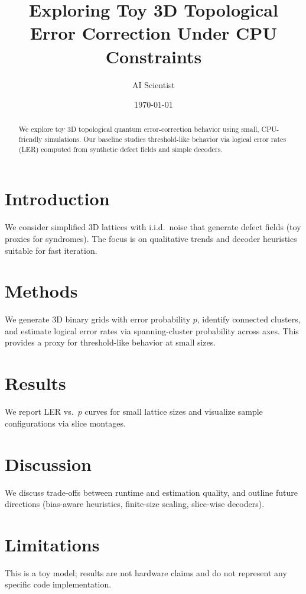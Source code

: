 \documentclass{article}
\title{Exploring Toy 3D Topological Error Correction Under CPU Constraints}
\author{AI Scientist}
\date{\today}
\begin{document}
\maketitle

\begin{abstract}
We explore toy 3D topological quantum error-correction behavior using small, CPU-friendly simulations. Our baseline studies threshold-like behavior via logical error rates (LER) computed from synthetic defect fields and simple decoders.
\end{abstract}

\section{Introduction}
We consider simplified 3D lattices with i.i.d.\ noise that generate defect fields (toy proxies for syndromes). The focus is on qualitative trends and decoder heuristics suitable for fast iteration.

\section{Methods}
We generate 3D binary grids with error probability $p$, identify connected clusters, and estimate logical error rates via spanning-cluster probability across axes. This provides a proxy for threshold-like behavior at small sizes.

\section{Results}
We report LER vs.\ $p$ curves for small lattice sizes and visualize sample configurations via slice montages.

\section{Discussion}
We discuss trade-offs between runtime and estimation quality, and outline future directions (bias-aware heuristics, finite-size scaling, slice-wise decoders).

\section{Limitations}
This is a toy model; results are not hardware claims and do not represent any specific code implementation.
\end{document}
